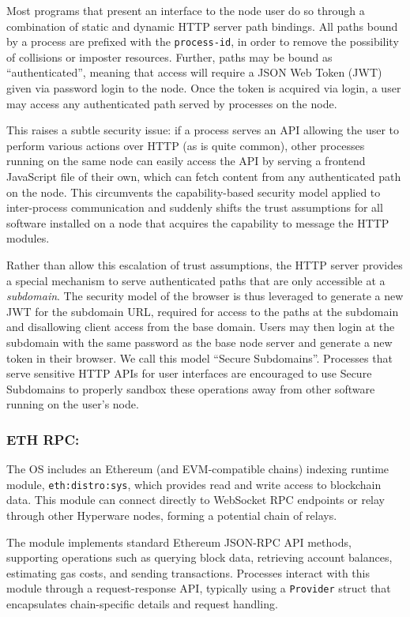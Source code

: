 \documentclass[runningheads]{llncs}
\begin{document}
Most programs that present an interface to the node user do so through a combination of static and dynamic HTTP server path bindings.
All paths bound by a process are prefixed with the \verb|process-id|, in order to remove the possibility of collisions or imposter resources.
Further, paths may be bound as ``authenticated'', meaning that access will require a JSON Web Token (JWT) given via password login to the node.
Once the token is acquired via login, a user may access any authenticated path served by processes on the node.

This raises a subtle security issue: if a process serves an API allowing the user to perform various actions over HTTP (as is quite common), other processes running on the same node can easily access the API by serving a frontend JavaScript file of their own, which can fetch content from any authenticated path on the node.
This circumvents the capability-based security model applied to inter-process communication and suddenly shifts the trust assumptions for all software installed on a node that acquires the capability to message the HTTP modules.

Rather than allow this escalation of trust assumptions, the HTTP server provides a special mechanism to serve authenticated paths that are only accessible at a \textit{subdomain}.
The security model of the browser is thus leveraged to generate a new JWT for the subdomain URL, required for access to the paths at the subdomain and disallowing client access from the base domain.
Users may then login at the subdomain with the same password as the base node server and generate a new token in their browser.
We call this model ``Secure Subdomains''.
Processes that serve sensitive HTTP APIs for user interfaces are encouraged to use Secure Subdomains to properly sandbox these operations away from other software running on the user's node.

\subsubsection{ETH RPC:}
\label{sec:oseth}
The OS includes an Ethereum (and EVM-compatible chains) indexing runtime module, \verb|eth:distro:sys|, which provides read and write access to blockchain data. This module can connect directly to WebSocket RPC endpoints or relay through other Hyperware nodes, forming a potential chain of relays.

The module implements standard Ethereum JSON-RPC API methods, supporting operations such as querying block data, retrieving account balances, estimating gas costs, and sending transactions. Processes interact with this module through a request-response API, typically using a \verb|Provider| struct that encapsulates chain-specific details and request handling.
\end{document}

